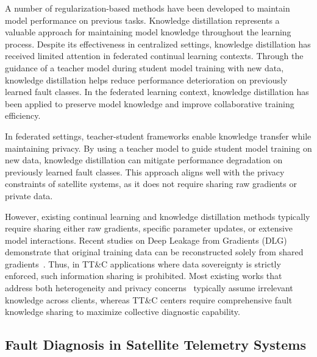 A number of regularization-based methods have been developed to maintain model performance on previous tasks. 
Knowledge distillation represents a valuable approach for maintaining model knowledge throughout the learning process. 
Despite its effectiveness in centralized settings, knowledge distillation has received limited attention in federated continual learning contexts.
Through the guidance of a teacher model during student model training with new data, knowledge distillation helps reduce performance deterioration on previously learned fault classes. 
In the federated learning context, knowledge distillation has been applied to preserve model knowledge and improve collaborative training efficiency.

In federated settings, teacher-student frameworks enable knowledge transfer while maintaining privacy. 
By using a teacher model to guide student model training on new data, knowledge distillation can mitigate performance degradation on previously learned fault classes. 
This approach aligns well with the privacy constraints of satellite systems, as it does not require sharing raw gradients or private data.

However, existing continual learning and knowledge distillation methods typically require sharing either raw gradients, specific parameter updates, or extensive model interactions. 
Recent studies on Deep Leakage from Gradients (DLG) demonstrate that original training data can be reconstructed solely from shared gradients~\cite{zhu2019deep, Geiping2020}. 
Thus, in TT\&C applications where data sovereignty is strictly enforced, such information sharing is prohibited. 
Most existing works that address both heterogeneity and privacy concerns~\cite{huang2022learn, jiang2021fedspeech} typically assume irrelevant knowledge across clients, 
whereas TT\&C centers require comprehensive fault knowledge sharing to maximize collective diagnostic capability.

\subsection{Fault Diagnosis in Satellite Telemetry Systems}

